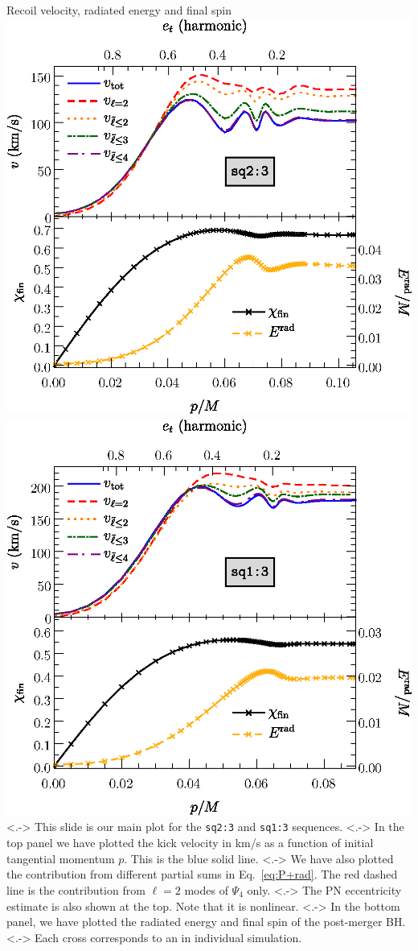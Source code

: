 \documentclass[smaller,aspectratio=169]{beamer}
\begin{document}
\begin{frame}{Recoil velocity, radiated energy and final spin}
    \includegraphics[width=0.45\linewidth]{kick-q1.5-wlabel.eps}
    \hfill
    \includegraphics[width=0.45\linewidth]{kick-q3-wlabel.eps}
    \note[item]<.->{
        This slide is our main plot for the \texttt{sq2:3} and \texttt{sq1:3}
        sequences.}
    \note[item]<.->{
        In the top panel we have plotted the kick velocity in km/s as a 
        function of initial tangential momentum $p$. This is the blue solid 
line.}
    \note[item]<.->{
        We have also plotted the contribution from different partial sums
        in Eq.~\eqref{eq:P+rad}. The red dashed line is the contribution
        from $\ell=2$ modes of $\Psi_4$ only.}
    \note[item]<.->{
        The PN eccentricity estimate is also shown at the top. Note that it is
        nonlinear.}
    \note[item]<.->{
        In the bottom panel, we have plotted the radiated energy and final spin
        of the post-merger BH.}
    \note[item]<.->{
        Each cross corresponds to an in individual simulation.}
\end{frame}
\end{document}
